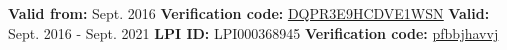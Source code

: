 %
%
%


\begin{certifications}
        {
            \textbf{Valid from:} Sept. 2016
            \textbf{Verification code:} 
                \href{https://www.certmetrics.com/comptia/public/verification.aspx?code=DQPR3E9HCDVE1WSN}
                {\underline{DQPR3E9HCDVE1WSN}}
        }
        {
            \textbf{Valid:} Sept. 2016 - Sept. 2021
            \textbf{LPI ID:} LPI000368945
            \textbf{Verification code:}
                \href{https://cs.lpi.org/caf/Xamman/certification}
                {\underline{pfbbjhavvj}}
        }
\end{certifications}